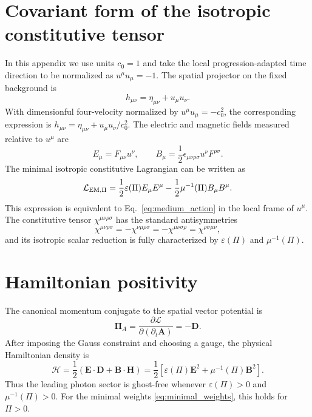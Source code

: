 \documentclass[12pt]{article}
\begin{document}
\begin{appendices}

\section{Covariant form of the isotropic constitutive tensor}
\label{app:covariant}

In this appendix we use units $c_0=1$ and take the local progression-adapted time direction to be normalized as $u^\mu u_\mu=-1$.  The spatial projector on the fixed background is
\begin{equation}
 h_{\mu\nu}=\eta_{\mu\nu}+u_\mu u_\nu .
\end{equation}
With dimensionful four-velocity normalized by $u^\mu u_\mu=-c_0^2$, the corresponding expression is $h_{\mu\nu}=\eta_{\mu\nu}+u_\mu u_\nu/c_0^2$.  The electric and magnetic fields measured relative to $u^\mu$ are
\begin{equation}
 E_\mu=F_{\mu\nu}u^\nu,
 \qquad
 B_\mu=\frac12\epsilon_{\mu\nu\rho\sigma}u^\nu F^{\rho\sigma}.
\end{equation}
The minimal isotropic constitutive Lagrangian can be written as
\begin{equation}
 \mathcal L_{\rm EM,\Pi}
 =\frac12\varepsilon(\Pi)E_\mu E^\mu
 -\frac12\mu^{-1}(\Pi)B_\mu B^\mu.
\end{equation}
This expression is equivalent to Eq.~\eqref{eq:medium_action} in the local frame of $u^\mu$.  The constitutive tensor $\chi^{\mu\nu\rho\sigma}$ has the standard antisymmetries
\begin{equation}
 \chi^{\mu\nu\rho\sigma}
 =-\chi^{\nu\mu\rho\sigma}
 =-\chi^{\mu\nu\sigma\rho}
 =\chi^{\rho\sigma\mu\nu},
\end{equation}
and its isotropic scalar reduction is fully characterized by $\varepsilon(\Pi)$ and $\mu^{-1}(\Pi)$.

\section{Hamiltonian positivity}
\label{app:hamiltonian}

The canonical momentum conjugate to the spatial vector potential is
\begin{equation}
 \boldsymbol\Pi_A=\frac{\partial\mathcal L}{\partial(\partial_t\mathbf A)}=-\mathbf D.
\end{equation}
After imposing the Gauss constraint and choosing a gauge, the physical Hamiltonian density is
\begin{equation}
 \mathcal H=\frac12\left(\mathbf E\cdot\mathbf D+\mathbf B\cdot\mathbf H\right)
 =\frac12\left[\varepsilon(\Pi)\mathbf E^2+\mu^{-1}(\Pi)\mathbf B^2\right].
\end{equation}
Thus the leading photon sector is ghost-free whenever $\varepsilon(\Pi)>0$ and $\mu^{-1}(\Pi)>0$.  For the minimal weights \eqref{eq:minimal_weights}, this holds for $\Pi>0$.


\end{appendices}
\end{document}

